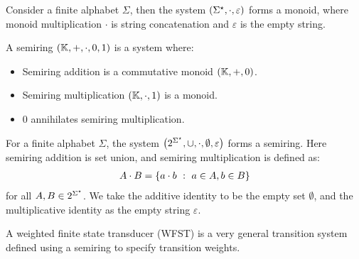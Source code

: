 \documentclass[12pt]{article}
\begin{document}
\begin{example}
  Consider a finite alphabet \(\Sigma\),
  then the system \(\left(\Sigma^{\star}, \cdot, \varepsilon\right)\)
  forms a monoid,
  where monoid multiplication \(\cdot\)
  is string concatenation and \(\varepsilon\) is the empty string.
\end{example}


\begin{definition}[Semiring]
  A semiring \(\left(\mathbb{K}, +, \cdot, 0, 1\right)\) is a system where:

  \begin{itemize}
    \item
      Semiring addition is a commutative monoid
      \(\left(\mathbb{K}, +, 0\right)\).

    \item
      Semiring multiplication
      \(\left(\mathbb{K}, \cdot, 1\right)\) is a monoid.

    \item
      \(0\) annihilates semiring multiplication.
  \end{itemize}

\end{definition}

\begin{example}
  For a finite alphabet \(\Sigma\),
  the system
  \(\left(2^{\Sigma^\star}, \cup, \cdot, \emptyset, \varepsilon\right)\)
  forms a semiring.
  Here semiring addition is set union,
  and semiring multiplication is defined as:
  \begin{align}
    A \cdot B
      = \left\{a \cdot b \  : \  a \in A, b \in B\right\}
  \end{align}
  for all \(A, B \in 2^{\Sigma^\star}\).
  We take
  the additive identity to be the empty set \(\emptyset\),
  and the multiplicative identity as the empty string \(\varepsilon\).
\end{example}

A weighted finite state transducer (WFST) is a very
general transition system defined
using a semiring to specify transition weights.
\end{document}
